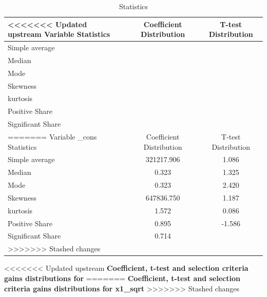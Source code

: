 \documentclass{article}
\begin{document}
\begin{table}[!h]
    \centering
    \caption{Statistics}
    \begin{tabular}{|l|c|c|}
    \hline
<<<<<<< Updated upstream
    Variable  Statistics &  Coefficient Distribution &  T-test Distribution  \\
    \hline
    \hline
    Simple average    &       &  \\
    \hline
    Median            &    &  \\
    \hline
    Mode              &      &  \\
    \hline
    Skewness          &       &  \\
    \hline
    kurtosis          &      &  \\
    \hline
    Positive Share    &      &  \\
    \hline
    Significant Share &  &  \\
=======
    Variable _cons Statistics &  Coefficient Distribution &  T-test Distribution  \\
    \hline
    \hline
    Simple average    & 321217.906      & 1.086 \\
    \hline
    Median            & 0.323   & 1.325 \\
    \hline
    Mode              & 0.323     & 2.420 \\
    \hline
    Skewness          & 647836.750      & 1.187 \\
    \hline
    kurtosis          & 1.572     & 0.086 \\
    \hline
    Positive Share    & 0.895     & -1.586 \\
    \hline
    Significant Share & 0.714 &  \\
>>>>>>> Stashed changes
    \hline
    \end{tabular}
\end{table}

\clearpage
\begin{center}
<<<<<<< Updated upstream
    \large{\textbf{Coefficient, t-test and selection criteria gains distributions for  }}
=======
    \large{\textbf{Coefficient, t-test and selection criteria gains distributions for x1_sqrt }}
>>>>>>> Stashed changes
\end{center}

\vspace{-5mm}
\end{document}
